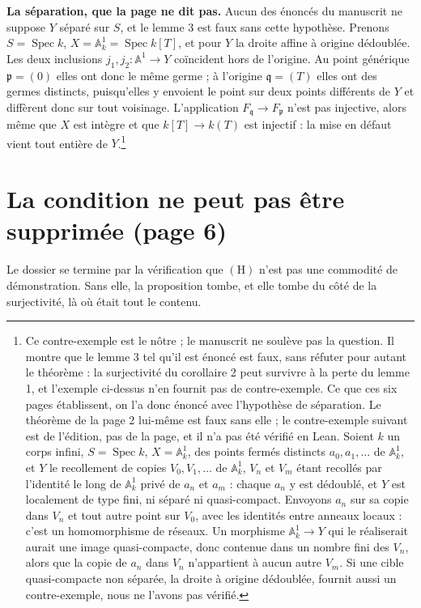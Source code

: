 \documentclass[11pt,a4paper]{article}
\begin{document}
\textbf{La séparation, que la page ne dit pas.} Aucun des énoncés du
manuscrit ne suppose $Y$ séparé sur $S$, et le lemme 3 est faux sans cette
hypothèse. Prenons $S = \operatorname{Spec} k$, $X = \mathbb{A}^1_k =
\operatorname{Spec} k[T]$, et pour $Y$ la droite affine à origine dédoublée.
Les deux inclusions $j_1, j_2 : \mathbb{A}^1 \to Y$ coïncident hors de
l'origine. Au point générique $\mathfrak p = (0)$ elles ont donc le même
germe ; à l'origine $\mathfrak q = (T)$ elles ont des germes distincts,
puisqu'elles y envoient le point sur deux points différents de $Y$ et
diffèrent donc sur tout voisinage. L'application
$F_{\mathfrak q} \to F_{\mathfrak p}$ n'est pas injective, alors même que
$X$ est intègre et que $k[T] \to k(T)$ est injectif : la mise en défaut vient
tout entière de $Y$.\footnote{Ce contre-exemple est le nôtre ; le manuscrit ne
soulève pas la question. Il montre que le lemme 3 tel qu'il est énoncé est
faux, sans réfuter pour autant le théorème : la surjectivité du corollaire 2 peut
survivre à la perte du lemme 1, et l'exemple ci-dessus n'en fournit pas de
contre-exemple. Ce que ces six pages établissent, on l'a donc énoncé avec
l'hypothèse de séparation. Le théorème de la page 2 lui-même est faux sans
elle ; le contre-exemple suivant est de l'édition, pas de la page, et il n'a
pas été vérifié en Lean. Soient $k$ un corps infini, $S = \operatorname{Spec}
k$, $X = \mathbb{A}^1_k$, des points fermés distincts $a_0, a_1, \ldots$ de
$\mathbb{A}^1_k$, et $Y$ le recollement de copies $V_0, V_1, \ldots$ de
$\mathbb{A}^1_k$, $V_n$ et $V_m$ étant recollés par l'identité le long de
$\mathbb{A}^1_k$ privé de $a_n$ et $a_m$ : chaque $a_n$ y est dédoublé, et
$Y$ est localement de type fini, ni séparé ni quasi-compact. Envoyons $a_n$
sur sa copie dans $V_n$ et tout autre point sur $V_0$, avec les identités
entre anneaux locaux : c'est un homomorphisme de réseaux. Un morphisme
$\mathbb{A}^1_k \to Y$ qui le réaliserait aurait une image quasi-compacte,
donc contenue dans un nombre fini des $V_n$, alors que la copie de $a_n$ dans
$V_n$ n'appartient à aucun autre $V_m$. Si une cible quasi-compacte non
séparée, la droite à origine dédoublée, fournit aussi un contre-exemple, nous
ne l'avons pas vérifié.}

\section*{La condition ne peut pas être supprimée (page 6)}

Le dossier se termine par la vérification que $(\mathrm{H})$ n'est pas une
commodité de démonstration. Sans elle, la proposition tombe, et elle tombe
du côté de la surjectivité, là où était tout le contenu.
\end{document}
